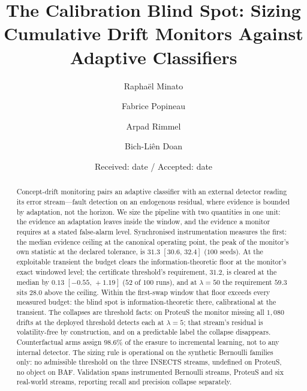\documentclass[smallextended]{svjour3}
\title{The Calibration Blind Spot: Sizing Cumulative Drift Monitors Against Adaptive Classifiers}
\author{Rapha\"el Minato \and Fabrice Popineau \and Arpad Rimmel \and Bich-Li\^en Doan}
\institute{\raggedright Universit\'e Paris-Saclay, CNRS, Laboratoire Interdisciplinaire des Sciences du Num\'erique, 91190 Gif-sur-Yvette, France \\
\email{\{raphael.minato, fabrice.popineau, arpad.rimmel, bich-lien.doan\}@centralesupelec.fr}}
\date{Received: date / Accepted: date}
\newcommand{\LearnSharePure}{98.6}           %
\newcommand{\CeilingCanon}{31.3}             %
\newcommand{\CeilingCanonCI}{[30.6,\,32.4]}  %
\newcommand{\RcusumFifty}{59.3}              %
\newcommand{\RcusumOp}{31.2}                 %
\newcommand{\MarginOp}{0.13}                 %
\newcommand{\MarginOpCI}{[-0.55,\,+1.19]}    %
\newcommand{\RunsClearOp}{52}                %
\newcommand{\ShortfallFifty}{28.0}           %
\begin{document}
\maketitle

\begin{abstract}
  Concept-drift monitoring pairs an adaptive classifier with an external detector reading its
  error stream---fault detection on an endogenous residual, where evidence is bounded by
  adaptation, not the horizon. We size the pipeline with two quantities in one unit: the
  evidence an adaptation leaves inside the window, and the evidence a monitor requires at a
  stated false-alarm level. Synchronised instrumentation measures the first: the median evidence
  ceiling at the canonical operating point, the peak of the monitor's own statistic at the
  declared tolerance, is $\CeilingCanon$ $\CeilingCanonCI$ ($100$ seeds). At the exploitable
  transient the budget clears the information-theoretic floor at the monitor's exact windowed
  level; the certificate threshold's requirement, $\RcusumOp$, is cleared at the median by
  $\MarginOp$ $\MarginOpCI$ ($\RunsClearOp$ of $100$ runs), and at $\lambda = 50$ the
  requirement $\RcusumFifty$ sits $\ShortfallFifty$ above the ceiling. Within the first-swap
  window that floor exceeds every measured budget: the blind spot is information-theoretic
  there, calibrational at the transient. The collapses are threshold facts: on ProteuS the
  monitor missing all $1{,}080$ drifts at the deployed threshold detects each at $\lambda = 5$;
  that stream's residual is volatility-free by construction, and on a predictable label the
  collapse disappears. Counterfactual arms assign $\LearnSharePure\%$ of the erasure to
  incremental learning, not to any internal detector. The sizing rule is operational on the
  synthetic Bernoulli families only: no admissible threshold on the three INSECTS streams,
  undefined on ProteuS, no object on BAF. Validation spans instrumented Bernoulli streams,
  ProteuS and six real-world streams, reporting recall and precision collapse separately.
\end{abstract}




\end{document}
